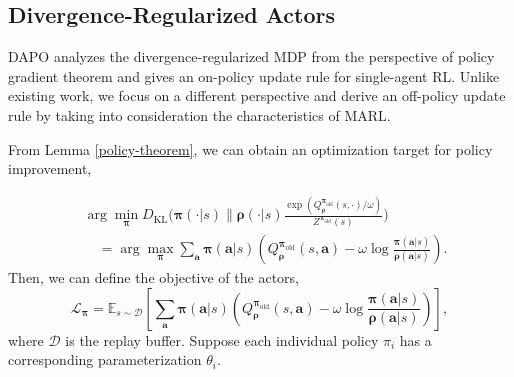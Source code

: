 \documentclass{article}
\begin{document}
\subsection{Divergence-Regularized Actors}

DAPO \citep{DIV-AUG} analyzes the divergence-regularized MDP from the perspective of policy gradient theorem \citep{PG} and gives an on-policy update rule for single-agent RL. Unlike existing work, we focus on a different perspective and derive an off-policy update rule by taking into consideration the characteristics of MARL. 

From Lemma \ref{policy-theorem}, we can obtain an optimization target for policy improvement,
\iffalse
\begin{equation}\nonumber
	\arg  \min_{\bm{\pi}} D_{\operatorname{KL}}\left( {\bm{\pi}}(\cdot|s) \| {\bm{\rho}}(\cdot|s) \frac{\exp\left( Q^{{\bm{\pi}}}_{\bm{\rho}}(s,\cdot) / \omega \right)}{Z^{\bm{\pi}}(s)} \right) 
	= \arg \max_{\bm{\pi}} \sum_{\bm{a}} {\bm{\pi}}(\bm{a}|s) \left(  Q^{{\bm{\pi}}}_{\bm{\rho}}(s,\bm{a}) - \omega \log \frac{{\bm{\pi}}(\bm{a}|s)}{{\bm{\rho}}(\bm{a}|s)}  \right). \\
	\vspace{-0.2cm}
\end{equation}
\fi
\begin{align*}
	& \arg  \min_{\bm{\pi}} D_{\operatorname{KL}}\bigg( {\bm{\pi}}(\cdot|s) \| {\bm{\rho}}(\cdot|s) \frac{\exp\left( Q^{{\bm{\pi}}_{\operatorname{old}}}_{\bm{\rho}}(s,\cdot) / \omega \right)}{Z^{\bm{\pi}_{\operatorname{old}}}(s)} \bigg) \\
	& \quad = \arg \max_{\bm{\pi}} \sum_{\bm{a}} {\bm{\pi}}(\bm{a}|s) \left(  Q^{{\bm{\pi}}_{\operatorname{old}}}_{\bm{\rho}}(s,\bm{a}) - \omega \log \frac{{\bm{\pi}}(\bm{a}|s)}{{\bm{\rho}}(\bm{a}|s)}  \right). 
\end{align*}
Then, we can define the objective of the actors, 
\begin{equation*}
	\mathcal{L}_{\bm{\pi}} = \mathbb{E}_{s \sim \mathcal{D}}\left[ \sum_{\bm{a}} {\bm{\pi}}(\bm{a}|s) \left(  Q^{{\bm{\pi}}_{\operatorname{old}}}_{\bm{\rho}}(s,\bm{a}) - \omega \log \frac{{\bm{\pi}}(\bm{a}|s)}{{\bm{\rho}}(\bm{a}|s)}  \right) \right],
\end{equation*}
where $\mathcal{D}$ is the replay buffer. Suppose each individual policy $\pi_i$ has a corresponding parameterization $\theta_i$. 
\end{document}
